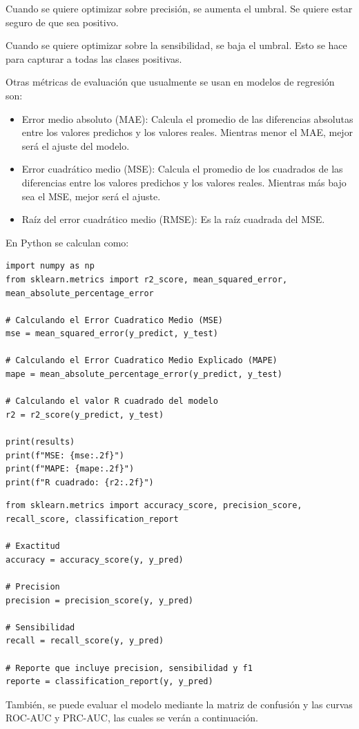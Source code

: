 \documentclass[a4paper, 12pt]{book}
\begin{document}
Cuando se quiere optimizar sobre precisión, se aumenta el umbral. Se quiere estar seguro de que sea positivo.

Cuando se quiere optimizar sobre la sensibilidad, se baja el umbral. Esto se hace para capturar a todas las clases positivas.


Otras métricas de evaluación que usualmente se usan en modelos de regresión son:
\begin{itemize}
	\item Error medio absoluto (MAE): Calcula el promedio de las diferencias absolutas entre los valores predichos y los valores reales. Mientras menor el MAE, mejor será el ajuste del modelo.
	\item Error cuadrático medio (MSE): Calcula el promedio de los cuadrados de las diferencias entre los valores predichos y los valores reales. Mientras más bajo sea el MSE, mejor será el ajuste.
	\item Raíz del error cuadrático medio (RMSE): Es la raíz cuadrada del MSE.
\end{itemize}
En Python se calculan como:

\begin{verbatim}
import numpy as np
from sklearn.metrics import r2_score, mean_squared_error, mean_absolute_percentage_error

# Calculando el Error Cuadratico Medio (MSE)
mse = mean_squared_error(y_predict, y_test)

# Calculando el Error Cuadratico Medio Explicado (MAPE)
mape = mean_absolute_percentage_error(y_predict, y_test)

# Calculando el valor R cuadrado del modelo
r2 = r2_score(y_predict, y_test)

print(results)
print(f"MSE: {mse:.2f}")
print(f"MAPE: {mape:.2f}")
print(f"R cuadrado: {r2:.2f}")
\end{verbatim}

\begin{verbatim}
from sklearn.metrics import accuracy_score, precision_score, recall_score, classification_report

# Exactitud
accuracy = accuracy_score(y, y_pred)

# Precision
precision = precision_score(y, y_pred)

# Sensibilidad
recall = recall_score(y, y_pred)

# Reporte que incluye precision, sensibilidad y f1
reporte = classification_report(y, y_pred)
\end{verbatim}
También, se puede evaluar el modelo mediante la matriz de confusión y las curvas ROC-AUC y PRC-AUC, las cuales se verán a continuación.
\end{document}
